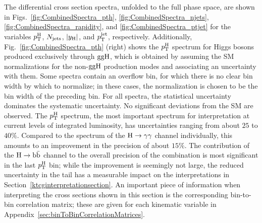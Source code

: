 The differential cross section spectra, unfolded to the full phase space, are shown in Figs.~\ref{fig:CombinedSpectra_pth}, \ref{fig:CombinedSpectra_njets}, \ref{fig:CombinedSpectra_rapidity}, and \ref{fig:CombinedSpectra_ptjet} for the variables $p_\mathrm{T}^\mathrm{H}$, $N_\text{jets} $, $\left|y_\mathrm{H}\right| $, and $p_\mathrm{T}^\text{jet} $, respectively.
% 
Additionally, Fig.~\ref{fig:CombinedSpectra_pth} (right) shows the $p_\mathrm{T}^\mathrm{H}$ spectrum for Higgs bosons produced exclusively through $\mathrm{g}\mathrm{g}\mathrm{H}$, which is obtained by assuming the SM normalizations for the non-$\mathrm{g}\mathrm{g}\mathrm{H}$ production modes and associating an uncertainty with them.
% 
Some spectra contain an overflow bin, for which there is no clear bin width by which to normalize; in these cases, the normalization is chosen to be the bin width of the preceding bin.
% 
For all spectra, the statistical uncertainty dominates the systematic uncertainty.
% 
No significant deviations from the SM are observed.
% 
The $p_\mathrm{T}^\mathrm{H}$ spectrum, the most important spectrum for interpretation at current levels of integrated luminosity, has uncertainties ranging from about $25$ to $40\%$.
% 
Compared to the spectrum of the $\mathrm{H}\to\mathrm{\gamma}\mathrm{\gamma}$ channel individually, this amounts to an improvement in the precision of about $15\%$.
% 
The contribution of the $\mathrm{H}\to\mathrm{b}\bar{\mathrm{b}}$ channel to the overall precision of the combination is most significant in the last $p_\mathrm{T}^\mathrm{H}$ bin; while the improvement is seemingly not large, the reduced uncertainty in the tail has a measurable impact on the interpretations in Section~\ref{ktcginterpretationsection}.
% 
An important piece of information when interpreting the cross sections shown in this section is the corresponding bin-to-bin correlation matrix; these are given for each kinematic variable in Appendix~\ref{sec:binToBinCorrelationMatrices}.


